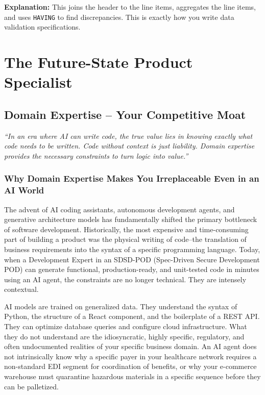 \documentclass[
  11pt,
  openany,
  oneside]{book}
\renewenvironment{quote}{\begin{customquote}}{\end{customquote}}
\begin{document}
\textbf{Explanation:} This joins the header to the line items,
aggregates the line items, and uses \texttt{HAVING} to find
discrepancies. This is exactly how you write data validation
specifications.

\part{The Future-State Product Specialist}

\chapter{Domain Expertise -- Your Competitive
Moat}\label{domain-expertise-your-competitive-moat}

\begin{quote}
\emph{``In an era where AI can write code, the true value lies in
knowing exactly what code needs to be written. Code without context is
just liability. Domain expertise provides the necessary constraints to
turn logic into value.''}
\end{quote}

\section{Why Domain Expertise Makes You Irreplaceable Even in an AI
World}\label{why-domain-expertise-makes-you-irreplaceable-even-in-an-ai-world}

The advent of AI coding assistants, autonomous development agents, and
generative architecture models has fundamentally shifted the primary
bottleneck of software development. Historically, the most expensive and
time-consuming part of building a product was the physical writing of
code--the translation of business requirements into the syntax of a
specific programming language. Today, when a Development Expert in an
SDSD-POD (Spec-Driven Secure Development POD) can generate functional,
production-ready, and unit-tested code in minutes using an AI agent, the
constraints are no longer technical. They are intensely contextual.

AI models are trained on generalized data. They understand the syntax of
Python, the structure of a React component, and the boilerplate of a
REST API. They can optimize database queries and configure cloud
infrastructure. What they do not understand are the idiosyncratic,
highly specific, regulatory, and often undocumented realities of your
specific business domain. An AI agent does not intrinsically know why a
specific payer in your healthcare network requires a non-standard EDI
segment for coordination of benefits, or why your e-commerce warehouse
must quarantine hazardous materials in a specific sequence before they
can be palletized.
\end{document}
